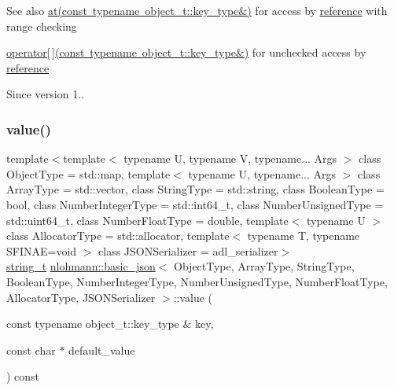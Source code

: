 \begin{DoxySeeAlso}{See also}
\mbox{\hyperlink{classnlohmann_1_1basic__json_a93403e803947b86f4da2d1fb3345cf2c}{at(const typename object\+\_\+t\+::key\+\_\+type\&)}} for access by \mbox{\hyperlink{classnlohmann_1_1basic__json_ac6a5eddd156c776ac75ff54cfe54a5bc}{reference}} with range checking 

\mbox{\hyperlink{classnlohmann_1_1basic__json_a233b02b0839ef798942dd46157cc0fe6}{operator\mbox{[}$\,$\mbox{]}(const typename object\+\_\+t\+::key\+\_\+type\&)}} for unchecked access by \mbox{\hyperlink{classnlohmann_1_1basic__json_ac6a5eddd156c776ac75ff54cfe54a5bc}{reference}}
\end{DoxySeeAlso}
\begin{DoxySince}{Since}
version 1.. 
\end{DoxySince}
\mbox{\label{classnlohmann_1_1basic__json_ad6a18403e7fbac9c4efd06facc71fc88}} 
\subsubsection{\texorpdfstring{value()}{value()}\hspace{0.1cm}{\footnotesize\ttfamily [2/4]}}
{\footnotesize\ttfamily template$<$template$<$ typename U, typename V, typename... Args $>$ class Object\+Type = std\+::map, template$<$ typename U, typename... Args $>$ class Array\+Type = std\+::vector, class String\+Type  = std\+::string, class Boolean\+Type  = bool, class Number\+Integer\+Type  = std\+::int64\+\_\+t, class Number\+Unsigned\+Type  = std\+::uint64\+\_\+t, class Number\+Float\+Type  = double, template$<$ typename U $>$ class Allocator\+Type = std\+::allocator, template$<$ typename T, typename S\+F\+I\+N\+A\+E=void $>$ class J\+S\+O\+N\+Serializer = adl\+\_\+serializer$>$ \\
\mbox{\hyperlink{classnlohmann_1_1basic__json_a61f8566a1a85a424c7266fb531dca005}{string\+\_\+t}} \mbox{\hyperlink{classnlohmann_1_1basic__json}{nlohmann\+::basic\+\_\+json}}$<$ Object\+Type, Array\+Type, String\+Type, Boolean\+Type, Number\+Integer\+Type, Number\+Unsigned\+Type, Number\+Float\+Type, Allocator\+Type, J\+S\+O\+N\+Serializer $>$\+::value (\begin{DoxyParamCaption}\item[{const typename object\+\_\+t\+::key\+\_\+type \&}]{key,  }\item[{const char $\ast$}]{default\+\_\+value }\end{DoxyParamCaption}) const\hspace{0.3cm}{\ttfamily [inline]}}




